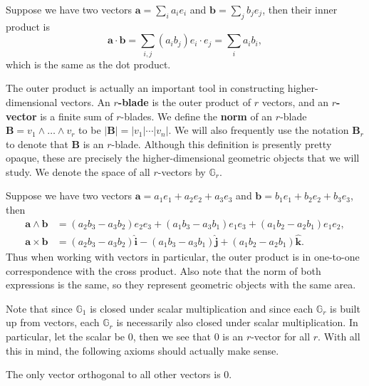 \documentclass[twoside,10pt]{article}
\begin{document}
\begin{ex}
Suppose we have two vectors $\mathbf{a} = \sum_i a_i e_i$ and $\mathbf{b} = \sum_j b_j e_j$, then their inner product is
\[
	\mathbf{a} \cdot \mathbf{b} = \sum_{i,j} (a_i b_j) e_i \cdot e_j = \sum_i a_i b_i,
\]
which is the same as the dot product.
\end{ex}

The outer product is actually an important tool in constructing higher-dimensional vectors. An \textbf{$r$-blade} is the outer product of $r$ vectors, and an \textbf{$r$-vector} is a finite sum of $r$-blades. We define the \textbf{norm} of an $r$-blade $\mathbf{B} = v_1 \wedge \dots \wedge v_r$ to be $|\mathbf{B}| = |v_1| \cdots |v_n|$. We will also frequently use the notation $\mathbf{B}_r$ to denote that $\mathbf{B}$ is an $r$-blade. Although this definition is presently pretty opaque, these are precisely the higher-dimensional geometric objects that we will study. We denote the space of all $r$-vectors by $\mathbb{G}_{r}$.

\begin{ex}
Suppose we have two vectors $\mathbf{a} = a_1e_1 + a_2e_2+a_3e_3$ and $\mathbf{b} = b_1e_1+b_2e_2+b_3e_3$, then
\begin{align*}
	\mathbf{a} \wedge \mathbf{b} &= (a_2b_3-a_3b_2)e_2e_3 + (a_1b_3-a_3b_1)e_1e_3 + (a_1b_2-a_2b_1)e_1e_2, \\
	\mathbf{a} \times \mathbf{b} &= (a_2b_3-a_3b_2)\hat{\mathbf{i}} - (a_1b_3-a_3b_1)\hat{\mathbf{j}} + (a_1b_2-a_2b_1)\hat{\mathbf{k}}.
\end{align*}
Thus when working with vectors in particular, the outer product is in one-to-one correspondence with the cross product. Also note that the norm of both expressions is the same, so they represent geometric objects with the same area.
\end{ex}


Note that since $\mathbb{G}_{1}$ is closed under scalar multiplication and since each $\mathbb{G}_{r}$ is built up from vectors, each $\mathbb{G}_{r}$ is necessarily also closed under scalar multiplication. In particular, let the scalar be 0, then we see that $0$ is an $r$-vector for all $r$. With all this in mind, the following axioms should actually make sense.

\begin{axiom}
	The only vector orthogonal to all other vectors is 0.
\end{axiom}
\end{document}
